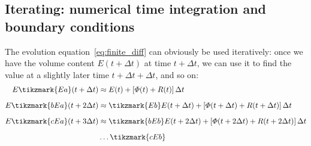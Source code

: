 \documentclass[a4paper,12pt,%
onecolumn,oneside,titlepage,%
british%
]{memoir}
\newcommand*{\incr}{\Delta}%
\renewcommand*{\|}[1][]{\nonscript\:#1\vert\nonscript\:\mathopen{}}
\newcommand*{\Dt}{\incr t}
\newcommand*{\yE}{E}
\newcommand*{\yH}{\varPhi}%
\newcommand*{\yR}{R}%
\begin{document}
\medskip

\subsection{Iterating: numerical time integration and boundary conditions}
\label{sec:timestep_iterate}

The evolution equation~\eqref{eq:finite_diff} can obviously be used iteratively:
once we have the volume content $\yE(t+\Dt)$ at time $t+\Dt$, we can use it to find the value at a slightly later time $t+\Dt+\Dt$, and so on:
\begin{equation}\label{eq:timestepped_evolution}
  \begin{aligned}
   \yE\tikzmark{Ea}(t+\Dt) &\approx
    \yE(t) + [\yH(t) + \yR(t)]\,\Dt
    \\[2\jot]
    \yE\tikzmark{bEa}(t+2\Dt)  &\approx
    \tikzmark{Eb}\yE(t+\Dt) + [\yH(t+\Dt) + \yR(t+\Dt)]\,\Dt
    \\[2\jot]
    \yE\tikzmark{cEa}(t+3\Dt)  &\approx
    \tikzmark{bEb}\yE(t+2\Dt) + [\yH(t+2\Dt) + \yR(t+2\Dt)]\,\Dt
    \\[2\jot]
    &\dotso\tikzmark{cEb}
  \end{aligned}
\end{equation}
\end{document}
